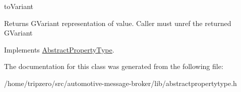 to\-Variant 

\begin{DoxyReturn}{Returns}
G\-Variant representation of value. Caller must unref the returned G\-Variant 
\end{DoxyReturn}


Implements \hyperlink{classAbstractPropertyType_ae4c8025e310eb06916a28e0341f3356d}{Abstract\-Property\-Type}.



The documentation for this class was generated from the following file\-:\begin{DoxyCompactItemize}
\item 
/home/tripzero/src/automotive-\/message-\/broker/lib/abstractpropertytype.\-h\end{DoxyCompactItemize}
